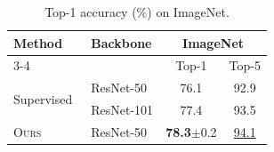 \documentclass{article}
\newcommand{\ours}{\textsc{Ours}}
\newcommand{\best}[1]{\textbf{#1}}
\begin{document}
\begin{table}[t]
\caption{Top-1 accuracy (\%) on ImageNet.}\label{tab:main}
\begin{tabular}{llcc}
\toprule
\multirow{2}{*}{Method} & \multirow{2}{*}{Backbone} & \multicolumn{2}{c}{ImageNet} \\
\cmidrule(lr){3-4}
 & & Top-1 & Top-5 \\
\midrule
\multirow{2}{*}{Supervised~\cite{he2016}} & ResNet-50 & 76.1 & 92.9 \\
 & ResNet-101 & 77.4 & 93.5 \\
\ours{} & ResNet-50 & \best{78.3}$\pm$0.2 & \underline{94.1} \\
\bottomrule
\end{tabular}
\end{table}

\end{document}
